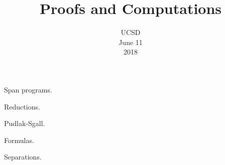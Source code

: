\documentclass[english]{beamer}
\title[Proofs and Computations]{
	Proofs and Computations
}
\author[Sokolov D.]{
	\texorpdfstring{
		\begin{columns}
    		\column{0.45\linewidth}
            \centering
            \rbox{
                Ankit Garg\\
                Microsoft Research
            }
            \column{0.45\linewidth}
            \centering
            \rbox{
                Mika G{\"{o}}{\"{o}}s\\
                Harvard University
            }
        \end{columns}
        \vspace{0.5cm}
        \begin{columns}
            \column{0.45\linewidth}
            \centering
            \rbox{
                Pritish Kamath\\
                MIT
            }
            \column{0.45\linewidth}
            \centering
            \rbox{
       	        Dmitry Sokolov\\
            	KTH University
            }
        \end{columns}
    }{
        temp
    }
}
\date{UCSD\\
	June 11\\
	2018
}
\begin{document}
	\maketitle


%    
%    
%    
%    


%    
    

    Span programs.

    Reductions.

    Pudlak-Sgall.

    Formulas.

    Separations.
\end{document}
